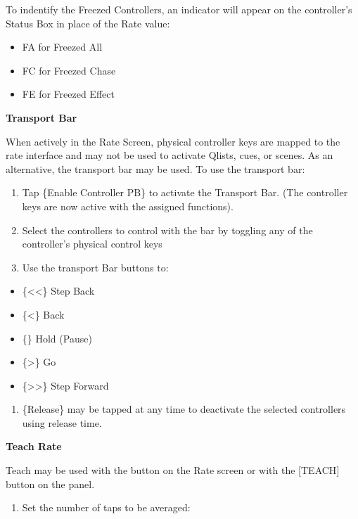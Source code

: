 \documentclass[
]{article}
\providecommand{\tightlist}{%
  \setlength{\itemsep}{0pt}\setlength{\parskip}{0pt}}
\begin{document}
To indentify the Freezed Controllers, an indicator will appear on the controller's Status Box in place of the Rate value:

\begin{itemize}
\item
  FA for Freezed All
\item
  FC for Freezed Chase
\item
  FE for Freezed Effect
\end{itemize}

\textbf{Transport Bar}

When actively in the Rate Screen, physical controller keys are mapped to the rate interface and may not be used to activate Qlists, cues, or scenes. As an alternative, the transport bar may be used. To use the transport bar:

\begin{enumerate}
\def\labelenumi{\arabic{enumi}.}
\item
  Tap \{Enable Controller PB\} to activate the Transport Bar. (The controller keys are now active with the assigned functions).
\item
  Select the controllers to control with the bar by toggling any of the controller's physical control keys
\item
  Use the transport Bar buttons to:
\end{enumerate}

\begin{itemize}
\item
  \{\textless\textless\} Step Back
\item
  \{\textbar\textless\} Back
\item
  \{\textbar\textbar\} Hold (Pause)
\item
  \{\textgreater\} Go
\item
  \{\textgreater\textgreater\} Step Forward
\end{itemize}

\begin{enumerate}
\def\labelenumi{\arabic{enumi}.}
\setcounter{enumi}{3}
\tightlist
\item
  \{Release\} may be tapped at any time to deactivate the selected controllers using release time.
\end{enumerate}

\textbf{Teach Rate}

Teach may be used with the button on the Rate screen or with the {[}TEACH{]} button on the panel.

\begin{enumerate}
\def\labelenumi{\arabic{enumi}.}
\tightlist
\item
  Set the number of taps to be averaged:
\end{enumerate}
\end{document}
